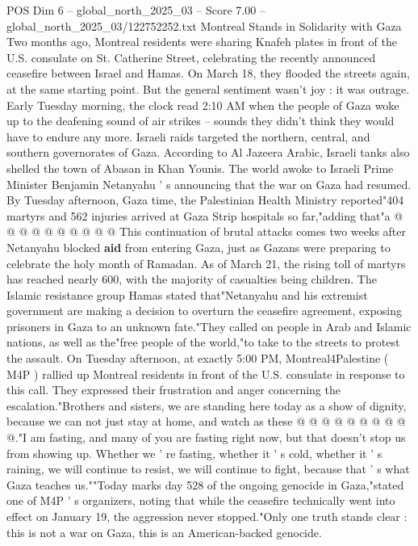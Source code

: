 \begin{textsample}{POS Dim 6 – global\_north\_2025\_03 – Score 7.00 – global\_north\_2025\_03/122752252.txt}  \label{ex:f6_pos_272}
Montreal Stands in Solidarity with Gaza Two months ago, Montreal residents were sharing Knafeh plates in front of the U.S. consulate on St.
Catherine Street, celebrating the recently announced ceasefire between Israel and Hamas.
On March 18, they flooded the streets again, at the same starting point.
But the general sentiment wasn't joy : it was outrage.
Early Tuesday morning, the clock read 2:10 AM when the people of Gaza woke up to the deafening sound of air strikes -- sounds they didn't think they would have to endure any more.
Israeli raids targeted the northern, central, and southern governorates of Gaza.
According to Al Jazeera Arabic, Israeli tanks also shelled the town of Abasan in Khan Younis.
The world awoke to Israeli Prime Minister Benjamin Netanyahu ' s announcing that the war on Gaza had resumed.
By Tuesday afternoon, Gaza time, the Palestinian Health Ministry reported"404 martyrs and 562 injuries arrived at Gaza Strip hospitals so far,"adding that"a @ @ @ @ @ @ @ @ @ @ This continuation of brutal attacks comes two weeks after Netanyahu blocked \textbf{aid} from entering Gaza, just as Gazans were preparing to celebrate the holy month of Ramadan.
As of March 21, the rising toll of martyrs has reached nearly 600, with the majority of casualties being children.
The Islamic resistance group Hamas stated that"Netanyahu and his extremist government are making a decision to overturn the ceasefire agreement, exposing prisoners in Gaza to an unknown fate."They called on people in Arab and Islamic nations, as well as the"free people of the world,"to take to the streets to protest the assault.
On Tuesday afternoon, at exactly 5:00 PM, Montreal4Palestine ( M4P ) rallied up Montreal residents in front of the U.S. consulate in response to this call.
They expressed their frustration and anger concerning the escalation."Brothers and sisters, we are standing here today as a show of dignity, because we can not just stay at home, and watch as these @ @ @ @ @ @ @ @ @ @."I am fasting, and many of you are fasting right now, but that doesn't stop us from showing up.
Whether we ' re fasting, whether it ' s cold, whether it ' s raining, we will continue to resist, we will continue to fight, because that ' s what Gaza teaches us.""Today marks day 528 of the ongoing genocide in Gaza,"stated one of M4P ' s organizers, noting that while the ceasefire technically went into effect on January 19, the aggression never stopped."Only one truth stands clear : this is not a war on Gaza, this is an American-backed genocide.

\end{textsample}
